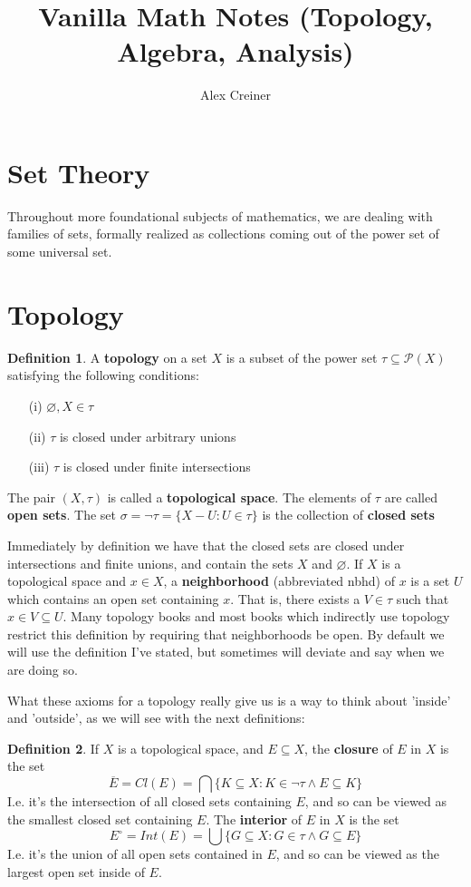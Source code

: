 \documentclass{article}
\title{Vanilla Math Notes (Topology, Algebra, Analysis)}
\author{Alex Creiner}
\theoremstyle{definition}
\newtheorem{definition}{Definition}[section]
\theoremstyle{plain}
\theoremstyle{theorem}
\begin{document}
\maketitle
\section{Set Theory}
Throughout more foundational subjects of mathematics, we are dealing with families of sets, formally realized as collections coming out of the power set of some universal set. 
\section{Topology}
	\begin{definition}
		A \textbf{topology} on a set $X$ is a subset of the power set $\tau \subseteq \mathcal{P}(X)$ satisfying the following conditions:
		\begin{itemize}
			\item[(i)] $\varnothing,X \in \tau$
			\item[(ii)] $\tau$ is closed under arbitrary unions
			\item[(iii)] $\tau$ is closed under finite intersections
		\end{itemize}
		The pair $(X,\tau)$ is called a \textbf{topological space}. The elements of $\tau$ are called \textbf{open sets}. The set $\sigma = \neg \tau =  \{X-U: U \in \tau\}$ is the collection of \textbf{closed sets}
	\end{definition}
	Immediately by definition we have that the closed sets are closed under intersections and finite unions, and contain the sets $X$ and $\varnothing$. If $X$ is a topological space and $x \in X$, a \textbf{neighborhood} (abbreviated nbhd) of $x$ is a set $U$ which contains an open set containing $x$. That is, there exists a $V \in \tau$ such that $x \in V \subseteq U$. Many topology books and most books which indirectly use topology restrict this definition by requiring that neighborhoods be open. By default we will use the definition I've stated, but sometimes will deviate and say when we are doing so. 
	\par What these axioms for a topology really give us is a way to think about 'inside' and 'outside', as we will see with the next definitions:
	\begin{definition}
		If $X$ is a topological space, and $E \subseteq X$, the \textbf{closure} of $E$ in $X$ is the set
		\[ \overline{E} = Cl(E) = \bigcap\{K \subseteq X: K \in \neg \tau \wedge E \subseteq K\} \]
	I.e. it's the intersection of all closed sets containing $E$, and so can be viewed as the smallest closed set containing $E$. The \textbf{interior} of $E$ in $X$ is the set
	\[ E^{\circ} = Int(E) = \bigcup\{G \subseteq X: G \in \tau \wedge G \subseteq E \} \]
	I.e. it's the union of all open sets contained in $E$, and so can be viewed as the largest open set inside of $E$.
	\end{definition}
\end{document}
